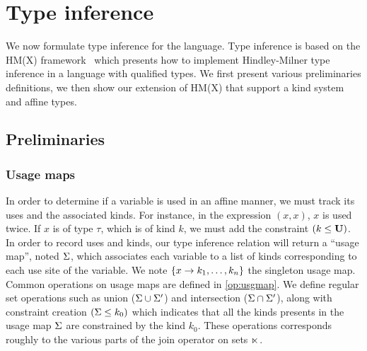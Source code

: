 \section{Type inference}

We now formulate type inference for the \lang language. Type inference is
based on the HM(X) framework~\citep{DBLP:journals/tapos/OderskySW99} which
presents how to implement Hindley-Milner type inference in a language
with qualified types. We first present various preliminaries definitions,
we then show our extension of HM(X) that support a kind system and affine
types.

\subsection{Preliminaries}

\subsubsection{Usage maps}

In order to determine if a variable is used in an affine manner, we must track
its uses and the associated kinds. For instance, in the expression
$(x,x)$, $x$ is used twice. If $x$ is of type $\tau$, which is of kind $k$,
we must add the constraint $(k \leq \mathbf{U})$. In order to record uses and kinds,
our type inference relation will return a ``usage map'', noted $\Sigma$,
which associates each variable to a list of kinds corresponding to each use site
of the variable.
We note $\left\{x \to k_1,\dots,k_n\right\}$ the singleton usage map.
Common operations on usage maps are defined in \cref{op:usgmap}. We define
regular set operations such as union
($\Sigma\cup\Sigma'$) and intersection ($\Sigma\cap\Sigma'$), along
with constraint creation $(\Sigma \leq k_0)$ which indicates that all the kinds
presents in the usage map $\Sigma$ are constrained by the kind $k_0$.
These operations corresponds roughly to the various parts of the join
operator on sets $\operatorname{\ltimes}$.

